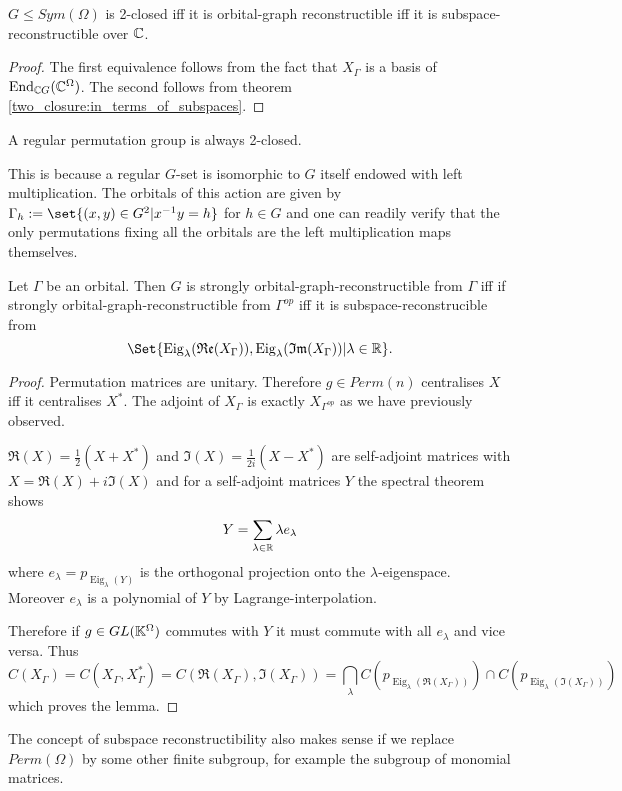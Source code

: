 \documentclass[fontsize=11pt,fleqn,a4paper]{scrartcl}
\begin{document}
\begin{corollary}
$G\leq Sym(\Omega)$ is 2-closed iff it is orbital-graph reconstructible iff it is subspace-reconstructible over $\mathbb{C}$.
\end{corollary}
\begin{proof}
The first equivalence follows from the fact that $X_\Gamma$ is a basis of $\operatorname{End}_{\mathbb{C} G}(\mathbb{C}^\Omega)$. The second follows from theorem \ref{two_closure:in_terms_of_subspaces}.
\end{proof}

\begin{example}
A regular permutation group is always 2-closed.

This is because a regular $G$-set is isomorphic to $G$ itself endowed with left multiplication. The orbitals of this action are given by $\Gamma_h:=\set{(x,y)\in G^2 | x^{-1} y=h}$ for $h\in G$ and one can readily verify that the only permutations fixing all the orbitals are the left multiplication maps themselves.
\end{example}

\begin{lemma}
Let $\Gamma$ be an orbital. Then $G$ is strongly orbital-graph-reconstructible from $\Gamma$ iff if strongly orbital-graph-reconstructible from $\Gamma^{op}$ iff it is subspace-reconstrucible from
\[\Set{\operatorname{Eig}_\lambda(\Re(X_\Gamma)),\operatorname{Eig}_\lambda(\Im(X_\Gamma)) | \lambda\in\IR}.\]
\end{lemma}
\begin{proof}
Permutation matrices are unitary. Therefore $g\in Perm(n)$ centralises $X$ iff it centralises $X^\ast$. The adjoint of $X_\Gamma$ is exactly $X_{\Gamma^{op}}$ as we have previously observed.

$\Re(X) = \frac{1}{2}(X+X^\ast)$ and $\Im(X)=\frac{1}{2i}(X-X^\ast)$ are self-adjoint matrices with $X=\Re(X)+i\Im(X)$ and for a self-adjoint matrices $Y$ the spectral theorem shows
\[Y = \sum_{\lambda\in\mathbb{R}} \lambda e_\lambda\]
where $e_\lambda=p_{\operatorname{Eig}_\lambda(Y)}$ is the orthogonal projection onto the $\lambda$-eigenspace. Moreover $e_\lambda$ is a polynomial of $Y$ by Lagrange-interpolation.

Therefore if $g\in GL(\mathbb{K}^\Omega)$ commutes with $Y$ it must commute with all $e_\lambda$ and vice versa. Thus
\[C(X_\Gamma) = C(X_\Gamma,X_\Gamma^\ast) = C(\Re(X_\Gamma),\Im(X_\Gamma))=\bigcap_{\lambda} C(p_{\operatorname{Eig}_\lambda(\Re(X_\Gamma))}) \cap C(p_{\operatorname{Eig}_\lambda(\Im(X_\Gamma))})\]
which proves the lemma.
\end{proof}

\begin{remark}
The concept of subspace reconstructibility also makes sense if we replace $Perm(\Omega)$ by some other finite subgroup, for example the subgroup of monomial matrices.
\end{remark}
\end{document}
